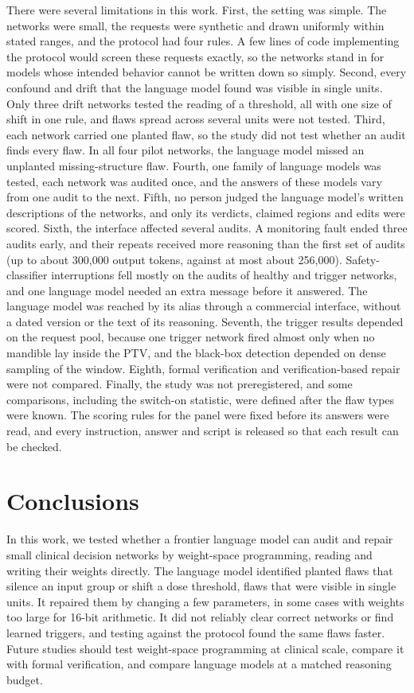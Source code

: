 \documentclass[aps,prx,reprint,superscriptaddress,nofootinbib]{revtex4-2}
\begin{document}
There were several limitations in this work. First, the setting was simple. The networks were small,
the requests were synthetic and drawn uniformly within stated ranges, and the protocol had four
rules. A few lines of code implementing the protocol would screen these requests exactly, so the
networks stand in for models whose intended behavior cannot be written down so simply. Second, every
confound and drift that the language model found was visible in single units. Only three drift
networks tested the reading of a threshold, all with one size of shift in one rule, and flaws spread
across several units were not tested. Third, each network carried one planted flaw, so the study did
not test whether an audit finds every flaw. In all four pilot networks, the language model missed an
unplanted missing-structure flaw. Fourth, one family of language models was tested, each network was
audited once, and the answers of these models vary from one audit to the next. Fifth, no person
judged the language model's written descriptions of the networks, and only its verdicts, claimed
regions and edits were scored. Sixth, the interface affected several audits. A monitoring fault
ended three audits early, and their repeats received more reasoning than the first set of audits (up
to about 300,000 output tokens, against at most about 256,000). Safety-classifier interruptions fell
mostly on the audits of healthy and trigger networks, and one language model needed an extra message
before it answered. The language model was reached by its alias through a commercial interface,
without a dated version or the text of its reasoning. Seventh, the trigger results depended on the
request pool, because one trigger network fired almost only when no mandible lay inside the PTV, and
the black-box detection depended on dense sampling of the window. Eighth, formal verification and
verification-based repair were not compared. Finally, the study was not preregistered, and some
comparisons, including the switch-on statistic, were defined after the flaw types were known. The
scoring rules for the panel were fixed before its answers were read, and every instruction, answer
and script is released so that each result can be checked.

\section{Conclusions}\label{conclusions}

In this work, we tested whether a frontier language model can audit and repair small clinical
decision networks by weight-space programming, reading and writing their weights directly. The
language model identified planted flaws that silence an input group or shift a dose threshold, flaws
that were visible in single units. It repaired them by changing a few parameters, in some cases with
weights too large for 16-bit arithmetic. It did not reliably clear correct networks or find learned
triggers, and testing against the protocol found the same flaws faster. Future studies should test
weight-space programming at clinical scale, compare it with formal verification, and compare
language models at a matched reasoning budget.
\end{document}
